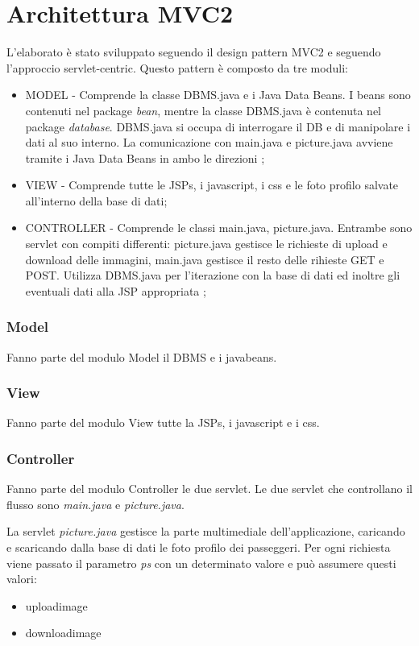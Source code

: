 \documentclass[a4paper,10pt]{article}
\begin{document}
\part{Architettura MVC2}
L'elaborato \`e stato sviluppato seguendo il design pattern MVC2 e seguendo l'approccio servlet-centric. Questo pattern \`e composto da tre moduli:

\begin{itemize}
 \item MODEL -  Comprende la classe DBMS.java e i Java Data Beans. I beans sono contenuti nel package \textit{bean}, mentre la classe DBMS.java \`e contenuta nel 
		package \textit{database}. DBMS.java si occupa di interrogare il DB e di manipolare i dati al suo interno. 
		La comunicazione con main.java e picture.java  avviene tramite i 
		Java Data Beans in ambo le direzioni ;
 \item VIEW - Comprende tutte le JSPs, i javascript, i css e le foto profilo salvate all'interno della base di dati;
 \item CONTROLLER - Comprende le classi main.java, picture.java. Entrambe sono servlet con compiti differenti: picture.java gestisce le richieste di upload e download delle
		    immagini, main.java gestisce il resto delle rihieste GET e POST. Utilizza DBMS.java per l'iterazione con la base di dati ed inoltre 
		    gli eventuali dati alla JSP appropriata ;
\end{itemize}

\section{Model}
Fanno parte del modulo Model il DBMS e i javabeans. 
\section{View}
Fanno parte del modulo View tutte la JSPs, i javascript e i css.
\section{Controller}
Fanno parte del modulo Controller le due servlet. Le due servlet che controllano il flusso sono \textit{main.java} e \textit{picture.java}. 

La servlet \textit{picture.java} gestisce la parte multimediale dell'applicazione, caricando e scaricando dalla base di dati le foto profilo dei passeggeri.
Per ogni richiesta viene passato il parametro \textit{ps} con un determinato valore e pu\`o assumere questi valori:
\begin{itemize}
 \item uploadimage
 \item downloadimage
\end{itemize}
\end{document}
